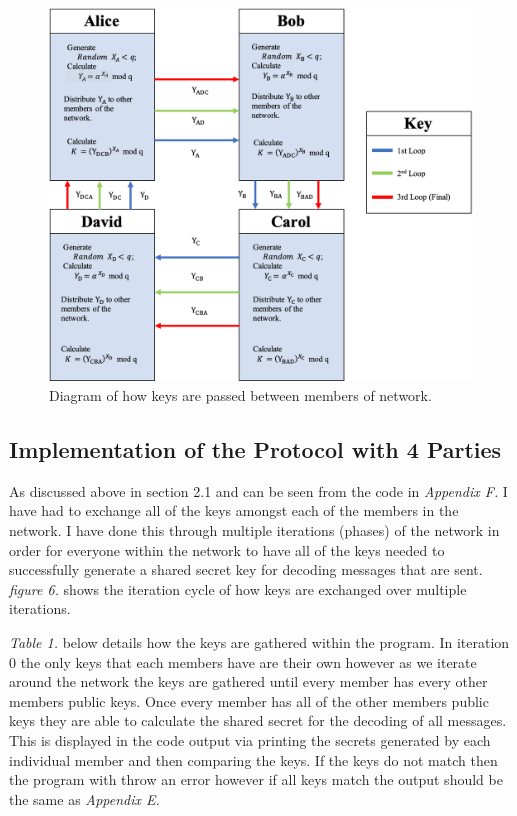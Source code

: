 \documentclass[a4paper, twoside, 11pt]{article}
\begin{document}
\begin{figure}[H]
	\centering
	\includegraphics[scale=0.6]{Images/keyExchange.png}
  \caption{Diagram of how keys are passed between members of network.}
\end{figure}


\subsection{Implementation of the Protocol with 4 Parties}
As discussed above in section 2.1 and can be seen from the code in \textit{Appendix F. } I have had to exchange all of the keys amongst each of the members in the network. I have done this through multiple iterations (phases) of the network in order
for everyone within the network to have all of the keys needed to successfully generate a shared secret key for decoding messages that are sent. 
\textit{figure 6.} shows the iteration cycle of how keys are exchanged over multiple iterations.

\textit{Table 1.} below details how the keys are gathered within the program. In iteration 0 the only keys that each
members have are their own however as we iterate around the network the keys are gathered until every member
has every other members public keys. Once every member has all of the other members public keys they are able to calculate the shared secret for the decoding of all messages. This is displayed in the code output via printing the secrets generated by each individual member and then comparing the keys. If the keys do not match then the program with throw an error however if all keys match the output should be the same as \textit{Appendix E.}
\end{document}

